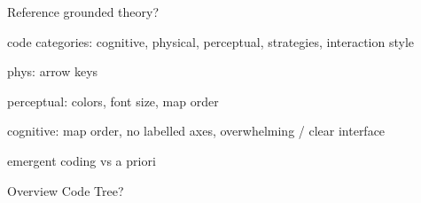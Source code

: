 Reference grounded theory?

code categories: cognitive, physical, perceptual, strategies, interaction style

phys: arrow keys

perceptual: colors, font size, map order

cognitive: map order, no labelled axes, overwhelming / clear interface

emergent coding vs a priori

Overview Code Tree?

%
%

